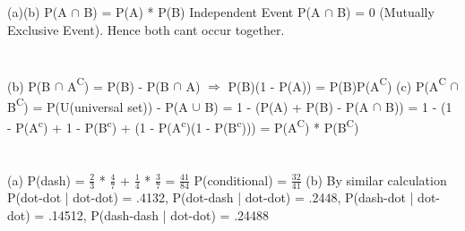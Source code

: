 \documentclass{report}
\begin{document}
{	\section{}
	(a)(b) P(A {$\cap$} B) = P(A) * P(B) Independent Event
	P(A {$\cap$} B) = 0 (Mutually Exclusive Event). Hence both cant occur together.
	
	\section{}
	(b) P(B {$\cap$} A{\textsuperscript{C}}) = P(B) - P(B {$\cap$} A) {$\Rightarrow$} P(B)(1 - P(A)) = P(B)P(A{\textsuperscript{C}})
	{\newline}
	(c) P(A{\textsuperscript{C}} {$\cap$} B{\textsuperscript{C}}) = P(U(universal set)) - P(A {$\cup$} B) = 1 - (P(A) + P(B) - P(A {$\cap$} B)) = 1 - (1 - P(A{\textsuperscript{c}}) + 1 - P(B{\textsuperscript{c}}) + (1 - P(A{\textsuperscript{c}})(1 - P(B{\textsuperscript{c}}))) = P(A{\textsuperscript{C}}) * P(B{\textsuperscript{C}})
	
	\section{}
	(a) P(dash) = {$\frac{2}{3}$} * {$\frac{4}{7}$} + {$\frac{1}{4}$} * {$\frac{3}{7}$} = {$\frac{41}{84}$} P(conditional) = {$\frac{32}{41}$}
	{\newline}
	(b) By similar calculation P(dot-dot | dot-dot) = .4132, P(dot-dash | dot-dot) = .2448, P(dash-dot | dot-dot) = .14512, P(dash-dash | dot-dot) = .24488
	{\newline}
}
\end{document}
